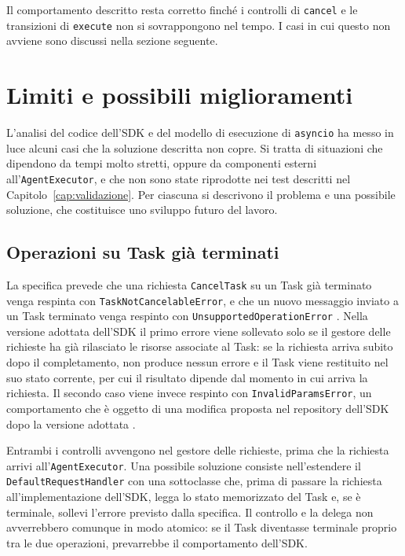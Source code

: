 Il comportamento descritto resta corretto finché i controlli di \texttt{cancel} e le transizioni di \texttt{execute} non si sovrappongono nel tempo. I casi in cui questo non avviene sono discussi nella sezione seguente.

\FloatBarrier

\section{Limiti e possibili miglioramenti}
\label{sec:limiti}

L'analisi del codice dell'SDK e del modello di esecuzione di \texttt{asyncio} ha messo in luce alcuni casi che la soluzione descritta non copre. Si tratta di situazioni che dipendono da tempi molto stretti, oppure da componenti esterni all'\texttt{AgentExecutor}, e che non sono state riprodotte nei test descritti nel Capitolo~\ref{cap:validazione}. Per ciascuna si descrivono il problema e una possibile soluzione, che costituisce uno sviluppo futuro del lavoro.

\subsection{Operazioni su Task già terminati}

La specifica prevede che una richiesta \texttt{CancelTask} su un Task già terminato venga respinta con \texttt{TaskNotCancelableError}, e che un nuovo messaggio inviato a un Task terminato venga respinto con \texttt{UnsupportedOperationError} \cite{a2aspec}. Nella versione adottata dell'SDK il primo errore viene sollevato solo se il gestore delle richieste ha già rilasciato le risorse associate al Task: se la richiesta arriva subito dopo il completamento, non produce nessun errore e il Task viene restituito nel suo stato corrente, per cui il risultato dipende dal momento in cui arriva la richiesta. Il secondo caso viene invece respinto con \texttt{InvalidParamsError}, un comportamento che è oggetto di una modifica proposta nel repository dell'SDK dopo la versione adottata \cite{a2apythonsdk,a2apythonpr1268}.

Entrambi i controlli avvengono nel gestore delle richieste, prima che la richiesta arrivi all'\texttt{AgentExecutor}. Una possibile soluzione consiste nell'estendere il \texttt{DefaultRequestHandler} con una sottoclasse che, prima di passare la richiesta all'implementazione dell'SDK, legga lo stato memorizzato del Task e, se è terminale, sollevi l'errore previsto dalla specifica. Il controllo e la delega non avverrebbero comunque in modo atomico: se il Task diventasse terminale proprio tra le due operazioni, prevarrebbe il comportamento dell'SDK.

